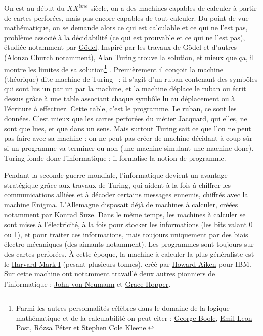 \documentclass[10pt]{article}
\begin{document}
On est au début du $XX^{\mathit{ème}}$ siècle, on a des machines capables de calculer à partir de cartes perforées, mais pas encore capables
de tout calculer. Du point de vue mathématique, on se demande alors ce qui est calculable et ce qui ne l'est pas, problème associé
à la décidabilité (ce qui est prouvable et ce qui ne l'est pas), étudiée notamment par \href{https://fr.wikipedia.org/wiki/Kurt_G\%C3\%B6del}{Gödel}.
Inspiré par les travaux de Gödel et d'autres (\href{https://fr.wikipedia.org/wiki/Alonzo_Church}{Alonzo Church}
notamment), \href{https://fr.wikipedia.org/wiki/Alan_Turing}{Alan Turing} trouve
la solution, et mieux que ça, il montre les limites de sa solution\footnote{
  Parmi les autres personnalités célèbres dans le domaine de la logique mathématique et de la calculabilité on peut citer :
  \href{https://fr.wikipedia.org/wiki/George_Boole}{George Boole},
  \href{https://fr.wikipedia.org/wiki/Emil_Post}{Emil Leon Post},
  \href{https://fr.wikipedia.org/wiki/R\%C3\%B3zsa_P\%C3\%A9ter}{Rózsa Péter} et
  \href{https://fr.wikipedia.org/wiki/Stephen_Cole_Kleene}{Stephen Cole Kleene}.
}
. Premièrement il conçoit la machine (théorique) dite \og machine de Turing \fg~:
il s'agit d'un ruban contenant des symbôles qui sont lus un par un par la machine, et la machine déplace le ruban ou écrit dessus
grâce à une table associant chaque symbôle lu au déplacement ou à l'écriture à effectuer.
Cette table, c'est le programme. Le ruban, ce sont les données.
C'est mieux que les cartes perforées du métier Jacquard, qui elles, ne sont que lues, et que dans un sens. Mais surtout
Turing sait ce que l'on ne peut pas faire avec sa machine : on ne peut pas créer de machine décidant à coup sûr
si un programme va terminer ou non (une machine simulant une machine donc). Turing fonde donc l'informatique :
il formalise la notion de programme.


Pendant la seconde guerre mondiale, l'informatique devient un avantage stratégique grâce aux travaux de Turing,
qui aident à la fois à chiffrer les communications alliées et à décoder certains messages ennemis, chiffrés avec la machine Enigma.
L'Allemagne disposait déjà de machines à calculer, créées notamment par \href{https://fr.wikipedia.org/wiki/Konrad_Zuse}{Konrad Suze}.
Dans le même temps, les machines à calculer se sont mises à l'électricité, à la fois pour stocker les informations (les bits valant 0 ou 1),
et pour traiter ces informations, mais toujours uniquement par des biais électro-mécaniques (des aimants notamment).
Les programmes sont toujours sur des cartes perforées. À cette époque,
la machine à calculer la plus généraliste est le \href{https://fr.wikipedia.org/wiki/Harvard_Mark_I}{Harvard Mark I} (pesant plusieurs tonnes), créé par
\href{https://en.wikipedia.org/wiki/Howard_H._Aiken}{Howard Aiken} pour IBM.
Sur cette machine ont notamment travaillé deux autres pionniers de l'informatique : \href{https://fr.wikipedia.org/wiki/John_von_Neumann}{John von Neumann}
et \href{https://fr.wikipedia.org/wiki/Grace_Hopper}{Grace Hopper}.
\end{document}
